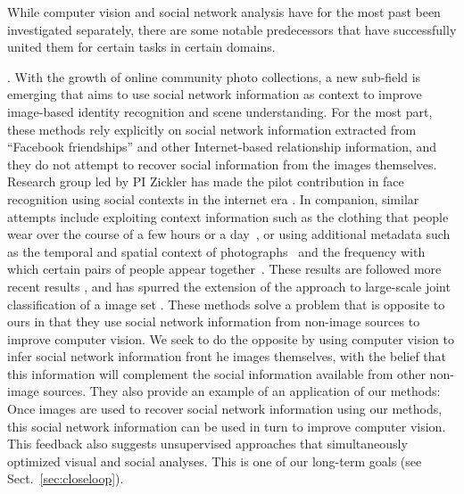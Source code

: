 While computer vision and social network analysis have for the most past been investigated separately, there are some notable predecessors that have successfully united them for certain tasks in certain domains.

. With the growth of online community photo collections, a new sub-field is emerging that aims to use social network information as context to improve image-based identity recognition and scene understanding. For the most part, these methods rely explicitly on social network information extracted from ``Facebook friendships'' and other Internet-based relationship information, and they do not attempt to recover social information from the images themselves. Research group led by PI Zickler has made the pilot contribution in face recognition using social contexts in the internet era \cite{Stone2008,Stone2010}. In companion, similar attempts include exploiting context information such as the clothing that people wear over the course of a few hours or a day~\cite{anguelov2007cir, zhang2003aah,  song2006cah, sivic2006fpr}, or using additional metadata such as the temporal and spatial context of photographs~\cite{naaman2005lcr, zhao2006apa} and the frequency with which certain pairs of people appear together~\cite{anguelov2007cir}. These results are followed more recent results \cite{Dikmen:classify,LeeBMVC2011,Poppe2012}, and has spurred the extension of the approach to large-scale joint classification of a image set \cite{McAuley:socialclassify}. These methods solve a problem that is opposite to ours in that they use social network information from non-image sources to improve computer vision. We seek to do the opposite by using computer vision to infer social network information front he images themselves, with the belief that this information will complement the social information available from other non-image sources. They also provide an example of an application of our methods: Once images are used to recover social network information using our methods, this social network information can be used in turn to improve computer vision. This feedback also suggests unsupervised approaches that simultaneously optimized visual and social analyses. This is one of our long-term goals (see Sect.~\ref{sec:closeloop}).


